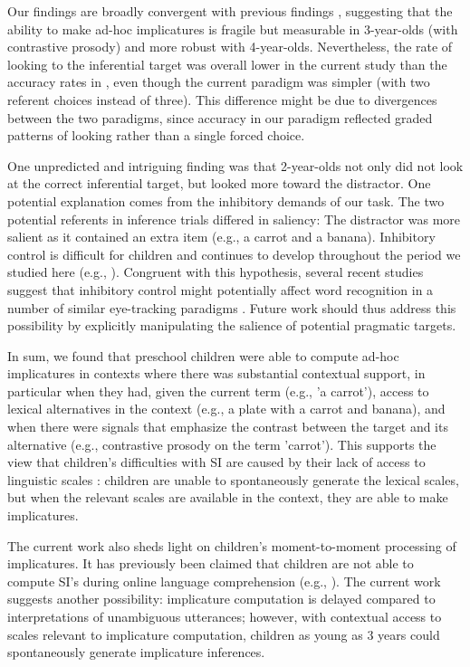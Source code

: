 \documentclass[10pt,letterpaper]{article}
\begin{document}
Our findings are broadly convergent with previous findings \cite{stillerLLD}, suggesting that the ability to make ad-hoc implicatures is fragile but measurable in 3-year-olds (with contrastive prosody) and more robust with 4-year-olds. Nevertheless, the rate of looking to the inferential target was overall lower in the current study than the accuracy rates in , even though the current paradigm was simpler (with two referent choices instead of three). This difference might be due to divergences between the two paradigms, since accuracy in our paradigm reflected graded patterns of looking rather than a single forced choice. 

One unpredicted and intriguing finding was that 2-year-olds not only did not look at the correct inferential target, but looked more toward the distractor. One potential explanation comes from the inhibitory demands of our task. The two potential referents in inference trials differed in saliency: The distractor was more salient as it contained an extra item (e.g., a carrot and a banana). Inhibitory control is difficult for children and continues to develop throughout the period we studied here (e.g.,  ). Congruent with this hypothesis, several recent studies suggest that inhibitory control might potentially affect word recognition in a number of similar eye-tracking paradigms \cite{yurovskybeyond,nordmeyer2013measuring}. Future work should thus address this possibility by explicitly manipulating the salience of potential pragmatic targets.

In sum, we found that preschool children were able to compute ad-hoc implicatures in contexts where there was substantial contextual support, in particular when they had, given the current term (e.g., 'a carrot'), access to lexical alternatives in the context (e.g., a plate with a carrot and banana), and when there were signals that emphasize the contrast between the target and its alternative (e.g., contrastive prosody on the term 'carrot'). This supports the view that children's difficulties with SI are caused by their lack of access to linguistic scales \cite{barner2011accessing}: children are unable to spontaneously generate the lexical scales, but when the relevant scales are available in the context, they are able to make implicatures. 

The current work also sheds light on children's moment-to-moment processing of implicatures. It has previously been claimed that children are not able to compute SI's during online language comprehension (e.g., ). The current work suggests another possibility: implicature computation is delayed compared to interpretations of unambiguous utterances; however, with contextual access to scales relevant to implicature computation, children as young as 3 years could spontaneously generate implicature inferences. 
\end{document}
